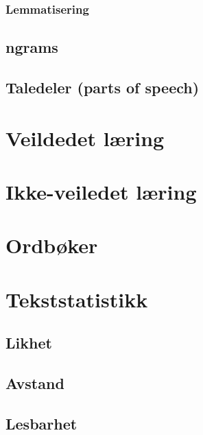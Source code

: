 \documentclass[
]{book}
\begin{document}
\hypertarget{lemmatisering}{%
\subsection{Lemmatisering}\label{lemmatisering}}

\hypertarget{ngrams}{%
\section{ngrams}\label{ngrams}}

\hypertarget{taledeler-parts-of-speech}{%
\section{Taledeler (parts of speech)}\label{taledeler-parts-of-speech}}

\hypertarget{sup}{%
\chapter{Veildedet læring}\label{sup}}

\hypertarget{unsup}{%
\chapter{Ikke-veiledet læring}\label{unsup}}

\hypertarget{ordboker}{%
\chapter{Ordbøker}\label{ordboker}}

\hypertarget{tekststats}{%
\chapter{Tekststatistikk}\label{tekststats}}

\hypertarget{likhet}{%
\section{Likhet}\label{likhet}}

\hypertarget{avstand}{%
\section{Avstand}\label{avstand}}

\hypertarget{lesbarhet}{%
\section{Lesbarhet}\label{lesbarhet}}
\end{document}
